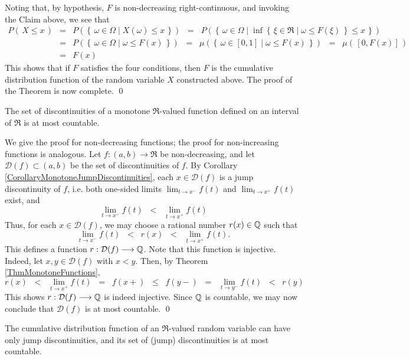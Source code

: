 Noting that, by hypothesis, $F$ is non-decreasing right-continuous, and invoking the Claim above, we see that
\begin{eqnarray*}
P\!\left(\,X \leq x\,\right)
&=& P\!\left(\left\{\,\omega\in\Omega\;\vert\; X(\omega) \leq x\,\right\}\right)
\;\;=\;\; P\!\left(\left\{\,\omega\in\Omega\;\vert\; \inf \left\{\,\xi \in \Re \;\vert\; \omega \leq F(\xi)\,\right\} \leq x\,\right\}\right)
\\
&=& P\!\left(\left\{\,\omega\in\Omega\;\vert\; \omega \leq F(x)\,\right\}\right)
\;\;=\;\; \mu\!\left(\left\{\,\omega\in [0,1] \;\vert\; \omega \leq F(x)\,\right\}\right)
\;\;=\;\; \mu\!\left(\,[0,F(x)]\,\right)
\\
&=& F(x)
\end{eqnarray*}
This shows that if $F$ satisfies the four conditions, then $F$ is the cumulative distribution function of the random variable $X$ constructed above.
The proof of the Theorem is now complete.
\qed

\begin{theorem}
\label{Thm:DarbouxFroda}
\mbox{}\vskip 0.1cm
\noindent
The set of discontinuities of a monotone $\Re$-valued function defined on an interval of $\Re$ is at most countable.
\end{theorem}

\proof
We give the proof for non-decreasing functions; the proof for non-increasing functions is analogous.
Let $f : (a,b) \longrightarrow \Re$ be non-decreasing, and let $\mathcal{D}(f) \subset (a,b)$ be the
set of discontinuities of $f$.
By Corollary \ref{CorollaryMonotoneJumpDiscontinuities}, each $x \in \mathcal{D}(f)$ is a jump discontinuity of $f$,
i.e. both one-sided limits $\lim_{t\rightarrow x^{-}}f(t)$ and $\lim_{t\rightarrow x^{+}}f(t)$ exist, and
\begin{equation*}
\lim_{t\rightarrow x^{-}}f(t)
\;\;<\;\;
\lim_{t\rightarrow x^{+}}f(t)
\end{equation*}
Thus, for each $x \in \mathcal{D}(f)$, we may choose a rational number $r(x) \in \mathbb{Q}$ such that
\begin{equation*}
\lim_{t\rightarrow x^{-}}f(t)
\;\;<\;\; r(x)
\;\;<\;\; \lim_{t\rightarrow x^{+}}f(t).
\end{equation*}
This defines a function $r : \mathcal{D}(f) \longrightarrow \mathbb{Q}$.
Note that this function is injective.
Indeed, let $x, y \in \mathcal{D}(f)$ with $x < y$.
Then, by Theorem \ref{ThmMonotoneFunctions},
\begin{equation*}
r(x)
\;\;<\;\; \lim_{t\rightarrow x^{+}}f(t)
\;\;=\;\; f(x+)
\;\;\leq\;\; f(y-)
\;\;=\;\; \lim_{t\rightarrow y^{-}}f(t)
\;\;<\;\; r(y)
\end{equation*}
This shows $r : \mathcal{D}(f) \longrightarrow \mathbb{Q}$ is indeed injective.
Since $\mathbb{Q}$ is countable, we may now conclude that $\mathcal{D}(f)$ is at most countable.
\qed

\begin{corollary}\quad
The cumulative distribution function of an $\Re$-valued random variable can have only jump discontinuities,
and its set of (jump) discontinuities is at most countable.
\end{corollary}

